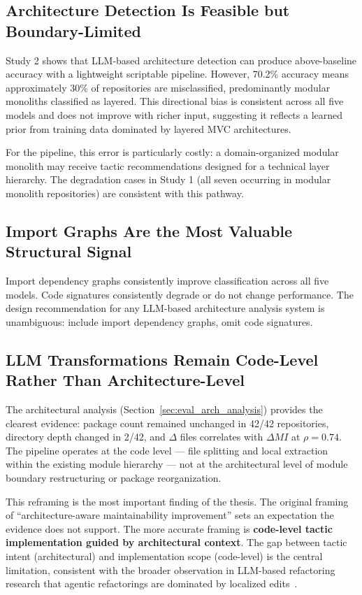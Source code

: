 \subsection{Architecture Detection Is Feasible but Boundary-Limited}

Study 2 shows that LLM-based architecture detection can produce above-baseline accuracy with a lightweight scriptable pipeline. However, 70.2\% accuracy means approximately 30\% of repositories are misclassified, predominantly modular monoliths classified as layered. This directional bias is consistent across all five models and does not improve with richer input, suggesting it reflects a learned prior from training data dominated by layered MVC architectures.

For the pipeline, this error is particularly costly: a domain-organized modular monolith may receive tactic recommendations designed for a technical layer hierarchy. The degradation cases in Study 1 (all seven occurring in modular monolith repositories) are consistent with this pathway.

\subsection{Import Graphs Are the Most Valuable Structural Signal}

Import dependency graphs consistently improve classification across all five models. Code signatures consistently degrade or do not change performance. The design recommendation for any LLM-based architecture analysis system is unambiguous: include import dependency graphs, omit code signatures.

\subsection{LLM Transformations Remain Code-Level Rather Than Architecture-Level}

The architectural analysis (Section~\ref{sec:eval_arch_analysis}) provides the clearest evidence: package count remained unchanged in 42/42 repositories, directory depth changed in 2/42, and $\Delta$ files correlates with $\Delta MI$ at $\rho = 0.74$. The pipeline operates at the code level — file splitting and local extraction within the existing module hierarchy — not at the architectural level of module boundary restructuring or package reorganization.

This reframing is the most important finding of the thesis. The original framing of ``architecture-aware maintainability improvement'' sets an expectation the evidence does not support. The more accurate framing is \textbf{code-level tactic implementation guided by architectural context}. The gap between tactic intent (architectural) and implementation scope (code-level) is the central limitation, consistent with the broader observation in LLM-based refactoring research that agentic refactorings are dominated by localized edits~\cite{horikawa2025agentic, martinez2025refactoring}.

